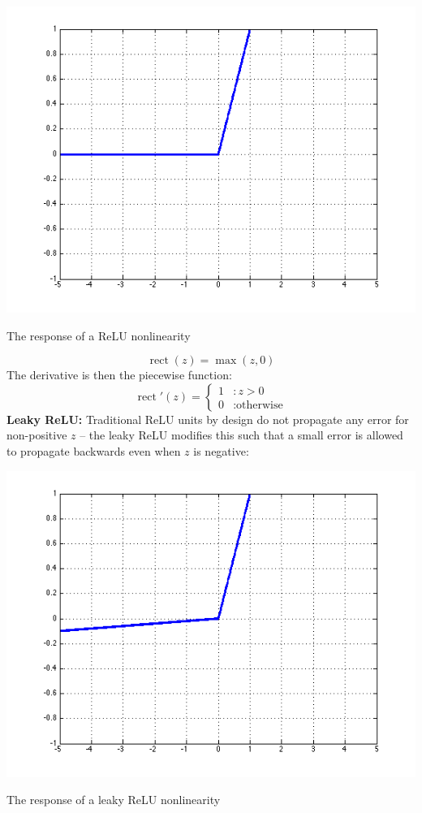 \documentclass{tufte-handout}
\begin{document}
\begin{marginfigure}%
  \includegraphics[width=\linewidth]{graph_relu}
  \caption{The response of a ReLU nonlinearity}
  \label{fig:graph_relu}
\end{marginfigure}
$$\operatorname{rect}(z) = \operatorname{max}(z, 0)$$
The derivative is then the piecewise function:
\begin{displaymath}
    \operatorname{rect}'(z) = \left\{
     \begin{array}{cl}
       1 & : z > 0\\
       0 & : \text{otherwise}
     \end{array}
   \right.
\end{displaymath} 
\textbf{Leaky ReLU:} Traditional ReLU units by design do not propagate any error for non-positive $z$ -- the leaky ReLU modifies this such that a small error is allowed to propagate backwards even when $z$ is negative:

\begin{marginfigure}%
  \includegraphics[width=\linewidth]{graph_leaky}
  \caption{The response of a leaky ReLU nonlinearity}
  \label{fig:graph_leaky}
\end{marginfigure}
\end{document}

